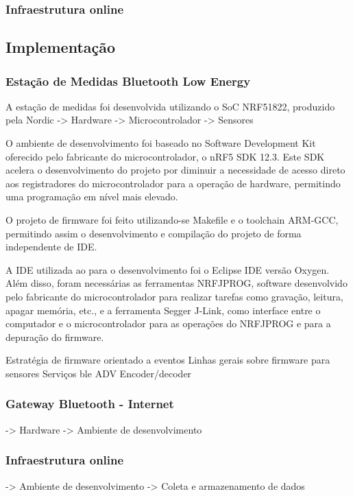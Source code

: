 
\subsubsection{Infraestrutura online}


\subsection{Implementação}

\subsubsection{Estação de Medidas Bluetooth Low Energy}

A estação de medidas foi desenvolvida utilizando o SoC NRF51822, produzido pela Nordic
-> Hardware
-> Microcontrolador
-> Sensores		

O ambiente de desenvolvimento foi baseado no Software Development Kit oferecido pelo fabricante do microcontrolador, o nRF5 SDK 12.3. Este SDK acelera o desenvolvimento do projeto por diminuir a necessidade de acesso direto aos registradores do microcontrolador para a operação de hardware, permitindo uma programação em nível mais elevado.

O projeto de firmware foi feito utilizando-se Makefile e o toolchain ARM-GCC, permitindo assim o desenvolvimento e compilação do projeto de forma independente de IDE.

A IDE utilizada ao para o desenvolvimento foi o Eclipse IDE versão Oxygen. Além disso, foram necessárias as ferramentas NRFJPROG, software desenvolvido pelo fabricante do microcontrolador para realizar tarefas como gravação, leitura, apagar memória, etc., e a ferramenta Segger J-Link, como interface entre o computador e o microcontrolador para as operações do NRFJPROG e para a depuração do firmware.


Estratégia de firmware orientado a eventos
Linhas gerais sobre firmware para sensores
Serviços ble
ADV Encoder/decoder


\subsubsection{Gateway Bluetooth - Internet}
			-> Hardware
			-> Ambiente de desenvolvimento

\subsubsection{Infraestrutura online}
-> Ambiente de desenvolvimento	
-> Coleta e armazenamento de dados
